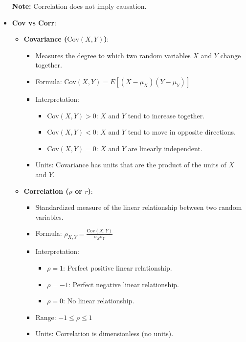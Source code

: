 \documentclass{report}
\begin{document}
\begin{itemize}
\begin{itemize}
            \end{itemize}
            \textbf{Note:} Correlation does not imply causation.
        \item \textbf{Cov vs Corr}:
            \begin{itemize}
                \item \textbf{Covariance (\(\text{Cov}(X, Y)\))}:
                    \begin{itemize}
                        \item Measures the degree to which two random variables \(X\) and \(Y\) change together.
                        \item Formula: \(\text{Cov}(X, Y) = E[(X - \mu_X)(Y - \mu_Y)]\)
                        \item Interpretation:
                            \begin{itemize}
                                \item \(\text{Cov}(X, Y) > 0\): \(X\) and \(Y\) tend to increase together.
                                \item \(\text{Cov}(X, Y) < 0\): \(X\) and \(Y\) tend to move in opposite directions.
                                \item \(\text{Cov}(X, Y) = 0\): \(X\) and \(Y\) are linearly independent.
                            \end{itemize}
                        \item Units: Covariance has units that are the product of the units of \(X\) and \(Y\).
                    \end{itemize}

                \item \textbf{Correlation (\(\rho\) or \(r\))}:
                    \begin{itemize}
                        \item Standardized measure of the linear relationship between two random variables.
                        \item Formula: \(\rho_{X,Y} = \frac{\text{Cov}(X, Y)}{\sigma_X \sigma_Y}\)
                        \item Interpretation:
                            \begin{itemize}
                                \item \(\rho = 1\): Perfect positive linear relationship.
                                \item \(\rho = -1\): Perfect negative linear relationship.
                                \item \(\rho = 0\): No linear relationship.
                            \end{itemize}
                        \item Range: \(-1 \leq \rho \leq 1\)
                        \item Units: Correlation is dimensionless (no units).
                    \end{itemize}
            \end{itemize}


\end{itemize}
\end{document}
